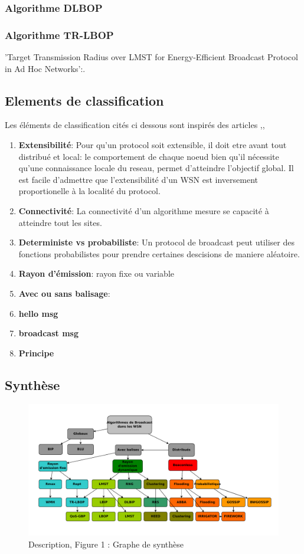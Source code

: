 \subsubsection{Algorithme DLBOP}
\cite{Cartigny2004}
\subsubsection{Algorithme TR-LBOP}
'Target Transmission Radius over LMST for Energy-Efficient Broadcast Protocol in Ad Hoc Networks':\cite{Ingelrest2004}.\\


\subsection{Elements de classification}
Les éléments de classification cités ci dessous sont inspirés des articles \cite{stojmenovic2004},\cite{ingelrest2005},\cite{wu2003}
\begin{enumerate}
 \item  \textbf{Extensibilité}: Pour qu'un protocol soit extensible, il doit etre avant tout distribué et local: le comportement de chaque noeud bien qu'il
nécessite qu'une connaissance locale du reseau, permet d'atteindre l'objectif global. Il est facile d'admettre que l'extensibilité d'un WSN est inversement proportionelle à la localité du protocol. 
 \item  \textbf{Connectivité}: La connectivité d'un algorithme mesure se capacité à atteindre tout les sites.
 \item  \textbf{Deterministe vs probabiliste}: Un protocol de broadcast peut utiliser des fonctions probabilistes pour prendre certaines descisions de maniere aléatoire.
 \item  \textbf{Rayon d'émission}:  rayon fixe ou variable
 \item  \textbf{Avec ou sans balisage}:  
 \item  \textbf{hello msg} 
 \item  \textbf{broadcast msg} 
 \item  \textbf{Principe} 


 
\end{enumerate}



\subsection{Synthèse}

\begin{figure}[H]
\centering
\includegraphics[scale=1,angle=90]{Etat_de_l'art/source/classification}
\caption{Description, Figure 1 : Graphe de synthèse}
\end{figure} 


